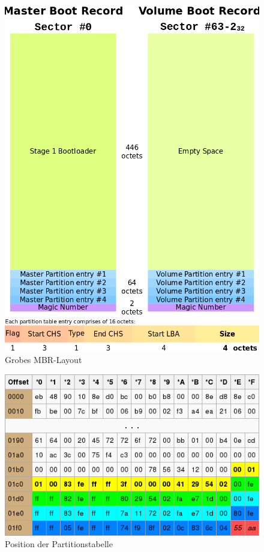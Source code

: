 \documentclass[11pt,a4paper]{article}
\begin{document}
\pagebreak{}

\begin{figure}[h]
	\centering
	\includegraphics[scale=0.4]{images/mbr_layout.png}
	\caption{Grobes MBR-Layout}
	\label{fig:mbr_layout}
\end{figure}

\pagebreak{}

\begin{figure}[h]
	\centering
	\includegraphics[scale=0.6]{images/partitionstabelle.png}
	\caption{Position der Partitionstabelle}
	\label{fig:mbr_parttab}
\end{figure}
\end{document}
